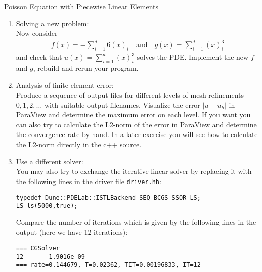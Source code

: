 \documentclass[12pt,a4paper]{article}
\begin{document}
\begin{Exercise}{Poisson Equation with Piecewise Linear Elements}
\begin{enumerate}
\item {\sc Solving a new problem}:\\
  Now consider
  \begin{align}
    f(x) =  -\sum_{i=1}^d 6(x)_i \quad\text{and}\quad  g(x) = \sum_{i=1}^d (x)_i^3
  \end{align}
  and check that $u(x)=\sum_{i=1}^d (x)_i^3$ solves the PDE. Implement
  the new $f$ and $g$, rebuild and rerun your program.

\item {\sc Analysis of finite element error}:\\
  Produce a sequence of output files for different levels of mesh
  refinements $0, 1, 2, \ldots$ with suitable output
  filenames. Visualize the error $|u-u_h|$ in Para\-View and determine
  the maximum error on each level.  If you want you can also try to
  calculate the L2-norm of the error in ParaView and determine the
  convergence rate by hand. In a later exercise you will see how to
  calculate the L2-norm directly in the c++ source.

\item {\sc Use a different solver}:\\
  You may also try to exchange the iterative linear solver by
  replacing it with the following lines in the driver file
  \lstinline{driver.hh}:
  \begin{lstlisting}
typedef Dune::PDELab::ISTLBackend_SEQ_BCGS_SSOR LS;
LS ls(5000,true);
  \end{lstlisting}
  Compare the number of iterations which is given by the following lines
  in the output (here we have 12 iterations):
  \begin{lstlisting}
=== CGSolver
12       1.9016e-09
=== rate=0.144679, T=0.02362, TIT=0.00196833, IT=12
  \end{lstlisting}
\end{enumerate}
\end{Exercise}
\end{document}
